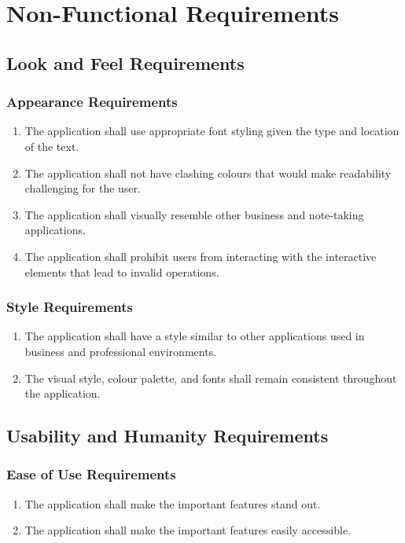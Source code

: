 \documentclass{article}
\begin{document}
\section{Non-Functional Requirements}
\subsection{Look and Feel Requirements}
\subsubsection{Appearance Requirements}
\begin{enumerate}
    \item The application shall use appropriate font styling given the type and location of the text.
    \item The application shall not have clashing colours that would make readability challenging for the user.
    \item The application shall visually resemble other business and note-taking applications.
    \item The application shall prohibit users from interacting with the interactive elements that lead to invalid operations.
\end{enumerate}

\subsubsection{Style Requirements}
\begin{enumerate}
    \item The application shall have a style similar to other applications used in business and professional environments.
    \item The visual style, colour palette, and fonts shall remain consistent throughout the application.
\end{enumerate}

\subsection{Usability and Humanity Requirements}
\subsubsection{Ease of Use Requirements}
\begin{enumerate}
    \item The application shall make the important features stand out.
    \item The application shall make the important features easily accessible.
\end{enumerate}
\end{document}
